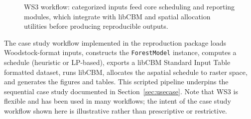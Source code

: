 \documentclass[review]{elsarticle}
\begin{document}
\begin{figure}[h]
  \centering
  \caption{WS3 workflow: categorized inputs feed core scheduling and reporting modules, which integrate with libCBM and spatial allocation utilities before producing reproducible outputs.}
  \label{fig:workflow_overview}
\end{figure}

The case study workflow implemented in the reproduction package loads Woodstock-format inputs, constructs the \texttt{ForestModel} instance, computes a schedule (heuristic or LP-based), exports a libCBM Standard Input Table formatted dataset, runs libCBM, allocates the aspatial schedule to raster space, and generates the figures and tables. This scripted pipeline underpins the sequential case study documented in Section~\ref{sec:usecase}. Note that WS3 is flexible and has been used in many workflows; the intent of the case study workflow shown here is illustrative rather than prescriptive or restrictive.
\end{document}
